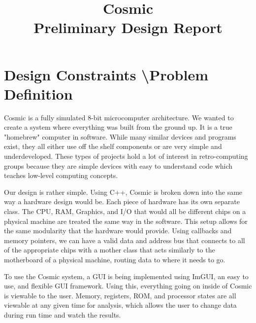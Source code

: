 \documentclass[conference]{IEEEtran}
\begin{document}
\title{
 Cosmic\\Preliminary Design Report}

\author{
\and
{}

}

\maketitle

\section{Design Constraints \textbackslash Problem Definition}

Cosmic is a fully simulated 8-bit microcomputer architecture. We wanted to create a system where everything was built from the ground up. It is a true "homebrew" computer in software. While many similar devices and programs exist, they all either use off the shelf components or are very simple and underdeveloped. These types of projects hold a lot of interest in retro-computing groups because they are simple devices with easy to understand code which teaches low-level computing concepts.

Our design is rather simple. Using C++, Cosmic is broken down into the same way a hardware design would be. Each piece of hardware has its own separate class. The CPU, RAM, Graphics, and I/O that would all be different chips on a physical machine are treated the same way in the software. This setup allows for the same modularity that the hardware would provide. Using callbacks and memory pointers, we can have a valid data and address bus that connects to all of the appropriate chips with a mother class that acts similarly to the motherboard of a physical machine, routing data to where it needs to go. 

To use the Cosmic system, a GUI is being implemented using ImGUI, an easy to use, and flexible GUI framework. Using this, everything going on inside of Cosmic is viewable to the user. Memory, registers, ROM, and processor states are all viewable at any given time for analysis, which allows the user to change data during run time and watch the results.
\end{document}
